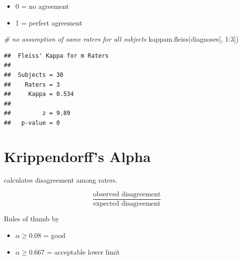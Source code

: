 \documentclass[
]{book}
\newenvironment{Shaded}{\begin{snugshade}}{\end{snugshade}}
\newcommand{\CommentTok}[1]{\textcolor[rgb]{0.56,0.35,0.01}{\textit{#1}}}
\newcommand{\DecValTok}[1]{\textcolor[rgb]{0.00,0.00,0.81}{#1}}
\newcommand{\FunctionTok}[1]{\textcolor[rgb]{0.00,0.00,0.00}{#1}}
\newcommand{\NormalTok}[1]{#1}
\newcommand{\SpecialCharTok}[1]{\textcolor[rgb]{0.00,0.00,0.00}{#1}}
\begin{document}
\begin{itemize}
\item
  0 = no agreement
\item
  1 = perfect agreement
\end{itemize}

\begin{Shaded}
\begin{Highlighting}[]
\CommentTok{\# no assumption of same raters for all subjects}
\FunctionTok{kappam.fleiss}\NormalTok{(diagnoses[, }\DecValTok{1}\SpecialCharTok{:}\DecValTok{3}\NormalTok{])}
\end{Highlighting}
\end{Shaded}

\begin{verbatim}
##  Fleiss' Kappa for m Raters
## 
##  Subjects = 30 
##    Raters = 3 
##     Kappa = 0.534 
## 
##         z = 9.89 
##   p-value = 0
\end{verbatim}

\hypertarget{krippendorffs-alpha}{%
\section{Krippendorff's Alpha}\label{krippendorffs-alpha}}

calculates disagreement among raters.

\[
\frac{\text{observed disagreement}}{\text{expected disagreement}}
\]

Rules of thumb by \citep{Shelley_1984}

\begin{itemize}
\item
  \(\alpha \ge 0.08\) = good
\item
  \(\alpha \ge 0.667\) = acceptable lower limit
\end{itemize}
\end{document}
